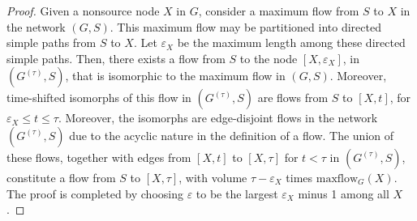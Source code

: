 \documentclass[journal]{IEEEtran}
\newtheorem*{proof}{\hskip 2em Proof}
\begin{document}
\begin{proof}
	Given a nonsource node $X$ in $G$, consider a maximum flow from $S$ to $X$ in the network $(G,S)$. This maximum flow may be partitioned into directed simple paths from $S$ to $X$. Let $\varepsilon_X$ be the maximum length among these directed simple paths. Then, there exists a flow from $S$ to the node $[X,\varepsilon_X]$, in $(G^{(\tau)},S)$, that is isomorphic to the maximum flow in $(G,S)$. Moreover, time-shifted isomorphs of this flow in $(G^{(\tau)},S)$ are flows from $S$ to $[X,t]$, for $\varepsilon_X\leq t\leq \tau$. Moreover, the isomorphs are edge-disjoint flows in the network $(G^{(\tau)},S)$ due to the acyclic nature in the definition of a flow. The union of these flows, together with edges from $[X,t]$ to $[X,\tau]$ for $t<\tau$ in	$(G^{(\tau)},S)$, constitute a flow from $S$ to $[X,\tau]$, with volume $\tau-\varepsilon_X$ times $\text{maxflow}_G(X)$. The proof is completed by choosing $\varepsilon$ to be the largest $\varepsilon_X$ minus 1 among all $X$.
\end{proof}
\end{document}
